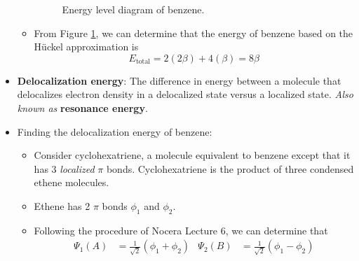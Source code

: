\documentclass[../notes.tex]{subfiles}
\begin{document}
\begin{itemize}
\begin{itemize}
\begin{figure}[h!]
            \caption{Energy level diagram of benzene.}
            \label{fig:benzeneMOdiagram}
        \end{figure}
        \item From Figure \ref{fig:benzeneMOdiagram}, we can determine that the energy of benzene based on the H\"{u}ckel approximation is
        \begin{equation*}
            E_\text{total} = 2(2\beta)+4(\beta) = 8\beta
        \end{equation*}
    \end{itemize}
    \item \textbf{Delocalization energy}: The difference in energy between a molecule that delocalizes electron density in a delocalized state versus a localized state. \emph{Also known as} \textbf{resonance energy}.
    \item Finding the delocalization energy of benzene:
    \begin{itemize}
        \item Consider cyclohexatriene, a molecule equivalent to benzene except that it has 3 \emph{localized} $\pi$ bonds. Cyclohexatriene is the product of three condensed ethene molecules.
        \item Ethene has 2 $\pi$ bonds $\phi_1$ and $\phi_2$.
        \item Following the procedure of Nocera Lecture 6, we can determine that
        \begin{align*}
            \Psi_1(A) &= \frac{1}{\sqrt{2}}(\phi_1+\phi_2)&
                \Psi_2(B) &= \frac{1}{\sqrt{2}}(\phi_1-\phi_2)
        \end{align*}

\end{itemize}
\end{itemize}
\end{document}
